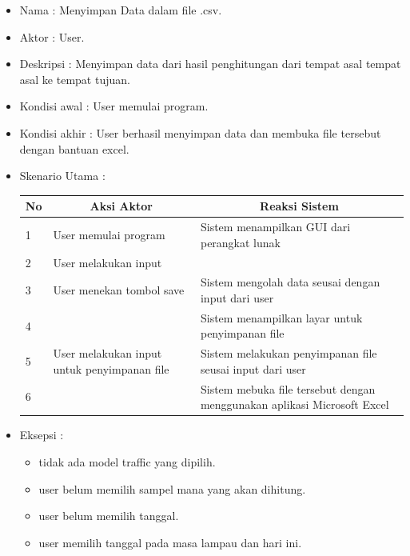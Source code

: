 \begin{enumerate}
	\begin{itemize}
		\item Nama : Menyimpan Data dalam file .csv.
		\item Aktor : User.
		\item Deskripsi : Menyimpan data dari hasil penghitungan dari tempat asal tempat asal ke tempat tujuan.
		\item Kondisi awal : User memulai program. 
		\item Kondisi akhir : User berhasil menyimpan data dan membuka file tersebut dengan bantuan excel. 
		\item Skenario Utama : \\
\begin{table}[H]
\centering
\begin{tabular}{|p{1cm}|p{4cm}|p{4cm}|}
\hline
\multicolumn{1}{|c|}{\textbf{No}} & \multicolumn{1}{c|}{\textbf{Aksi Aktor}}    & \multicolumn{1}{c|}{\textbf{Reaksi Sistem}}                             \\ \hline
1                                 & User memulai program                        & Sistem menampilkan GUI dari perangkat lunak                             \\ \hline
2                                 & User melakukan input                        &                                                                         \\ \hline
3                                 & User menekan tombol save                    & Sistem mengolah data seusai dengan input dari user                      \\ \hline
4                                 &                                             & Sistem menampilkan layar untuk penyimpanan file                         \\ \hline
5                                 & User melakukan input untuk penyimpanan file & Sistem melakukan penyimpanan file seusai input dari user                \\ \hline
6                                 &                                             & Sistem mebuka file tersebut dengan menggunakan aplikasi Microsoft Excel \\ \hline
\end{tabular}
\end{table}
		\item Eksepsi : 
		\begin{itemize}
			\item tidak ada model traffic yang dipilih.
			\item user belum memilih sampel mana yang akan dihitung.
			\item user belum memilih tanggal.
			\item user memilih tanggal pada masa lampau dan hari ini.
		\end{itemize}
	\end{itemize}	
\end{enumerate}

